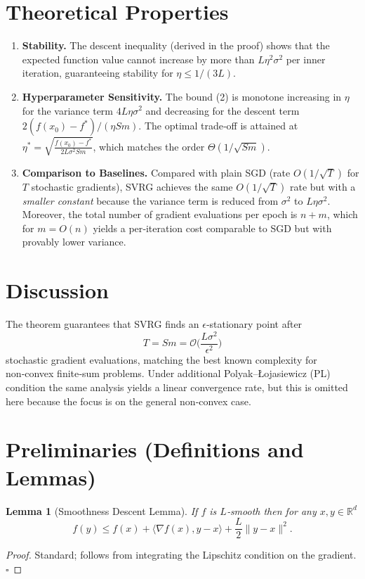 \documentclass{article}
\newtheorem{lemma}{Lemma}
\begin{document}
\section*{Theoretical Properties}
\begin{enumerate}
\item \textbf{Stability.} The descent inequality (derived in the proof) shows that the expected function value cannot increase by more than $L\eta^{2}\sigma^{2}$ per inner iteration, guaranteeing stability for $\eta\le1/(3L)$.
\item \textbf{Hyperparameter Sensitivity.} The bound (2) is monotone increasing in $\eta$ for the variance term $4L\eta\sigma^{2}$ and decreasing for the descent term $2(f(x_{0})-f^{*})/(\eta Sm)$. The optimal trade‑off is attained at $\eta^{*}= \sqrt{\frac{f(x_{0})-f^{*}}{2L\sigma^{2}Sm}}$, which matches the order $\Theta(1/\sqrt{Sm})$.
\item \textbf{Comparison to Baselines.} Compared with plain SGD (rate $O(1/\sqrt{T})$ for $T$ stochastic gradients), SVRG achieves the same $O(1/\sqrt{T})$ rate but with a \emph{smaller constant} because the variance term is reduced from $\sigma^{2}$ to $L\eta\sigma^{2}$. Moreover, the total number of gradient evaluations per epoch is $n+m$, which for $m=O(n)$ yields a per‑iteration cost comparable to SGD but with provably lower variance.
\end{enumerate}

\section*{Discussion}
The theorem guarantees that SVRG finds an $\epsilon$‑stationary point after
\[
T = Sm = \mathcal{O}\!\Big(\frac{L\sigma^{2}}{\epsilon^{2}}\Big)
\]
stochastic gradient evaluations, matching the best known complexity for non‑convex finite‑sum problems. Under additional Polyak–Łojasiewicz (PL) condition the same analysis yields a linear convergence rate, but this is omitted here because the focus is on the general non‑convex case.

\section*{Preliminaries (Definitions and Lemmas)}
\begin{lemma}[Smoothness Descent Lemma]\label{lem:smooth}
If $f$ is $L$‑smooth then for any $x,y\in\mathbb{R}^{d}$
\[
f(y)\le f(x)+\langle\nabla f(x),y-x\rangle+\frac{L}{2}\|y-x\|^{2}.
\tag{3}
\]
\end{lemma}
\begin{proof}
Standard; follows from integrating the Lipschitz condition on the gradient. \hfill $\square$
\end{proof}
\end{document}
